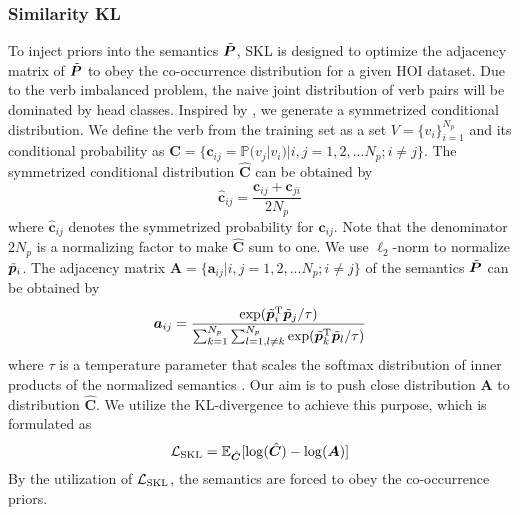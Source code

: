 \documentclass[letterpaper]{article} %
\begin{document}
\subsubsection{Similarity KL} To inject priors into the semantics $\Tilde{\bm{P}}$, SKL is designed to optimize the adjacency matrix of $\Tilde{\bm{P}}$ to obey the co-occurrence distribution for a given HOI dataset. Due to the verb imbalanced problem, the naive joint distribution of verb pairs will be dominated by head classes. Inspired by \cite{you2020multilabelMSE}, we generate a symmetrized conditional distribution. We define the verb from the training set as a set $V = \{v_i\}_{i=1}^{N_p}$ and its conditional probability as $\bm{C} = \{\bm{c}_{ij} = \mathbb{P}(v_{j}|v_{i})|i,j=1,2,...N_p;i \ne j \}$. The symmetrized conditional distribution $\hat{\bm{C}}$ can be obtained by
\begin{equation}
    \hat{\bm{c}}_{ij} = \frac{\bm{c}_{ij} + \bm{c}_{ji}}{2 N_p}
\end{equation}
where $\hat{\bm{c}}_{ij}$ denotes the symmetrized probability for $\bm{c}_{ij}$. Note that the denominator $2 N_p$ is a normalizing factor to make $\hat{\bm{C}}$ sum to one. We use $\ell_2$-norm to normalize $\Tilde{\bm{p}}_i$. The adjacency matrix $\bm{A} = \{\bm{a}_{ij}|i,j=1,2,...N_p;i \ne j \}$ of the semantics $\Tilde{\bm{P}}$ can be obtained by
\begin{equation}
    \bm{a}_{ij} = \frac{{\rm exp}(\Tilde{\bm{p}}_i^{\rm T} \Tilde{\bm{p}}_j / \tau)}{\sum\nolimits_{k=1}^{N_p}{\sum\nolimits_{l=1,l\neq k}^{N_p}{{\rm exp}(\Tilde{\bm{p}}_k^{\rm T} \Tilde{\bm{p}}_l / \tau)}}}
\end{equation}
where $\tau$ is a temperature parameter that scales the softmax distribution of inner products of the normalized semantics \cite{wu2018nonparametric_instance}. Our aim is to push close distribution $\bm{A}$ to distribution $\hat{\bm{C}}$. We utilize the KL-divergence to achieve this purpose, which is formulated as 
\begin{equation}
    \mathcal{L}_{\rm SKL} = \mathbb{E}_{\hat{\bm{C}}}[{\rm log}(\hat{\bm{C}}) - {\rm log}(\bm{A})]
\end{equation}
By the utilization of $\mathcal{L}_{\rm SKL}$, the semantics are forced to obey the co-occurrence priors.
\end{document}
